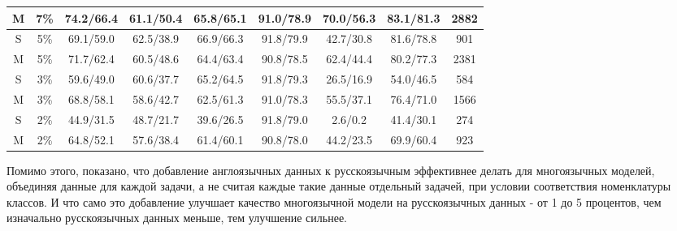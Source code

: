 \begin{table}
{\begin{tabular}{|c|c|c|c|c|c|c|c|c|}
M & 7\% & 74.2/66.4 & 61.1/50.4 & 65.8/65.1 & 91.0/78.9 & 70.0/56.3 & 83.1/81.3 & 2882 \\ \hline
S & 5\% & 69.1/59.0 & 62.5/38.9 & 66.9/66.3 & 91.8/79.9 & 42.7/30.8 & 81.6/78.8 & 901 \\
M & 5\% & 71.7/62.4 & 60.5/48.6 & 64.4/63.4 & 90.8/78.5 & 62.4/44.4 & 80.2/77.3 & 2381 \\ \hline
S & 3\% & 59.6/49.0 & 60.6/37.7 & 65.2/64.5 & 91.8/79.3 & 26.5/16.9 & 54.0/46.5 & 584 \\
M & 3\% & 68.8/58.1 & 58.6/42.7 & 62.5/61.3 & 91.0/78.3 & 55.5/37.1 & 76.4/71.0 & 1566 \\ \hline
S & 2\% & 44.9/31.5 & 48.7/21.7 & 39.6/26.5 & 91.8/79.0 & 2.6/0.2 & 41.4/30.1 & 274 \\
M & 2\% & 64.8/52.1 & 57.6/38.4 & 61.4/60.1 & 90.8/78.0 & 44.2/23.5 & 69.9/60.4 & 923 \\ \hline
\end{tabular}
}
\end{table}


Помимо этого, показано, что добавление англоязычных данных к русскоязычным эффективнее делать для многоязычных моделей, объединяя данные для каждой задачи, а не считая каждые такие данные отдельный задачей, при условии соответствия номенклатуры классов. И что само это добавление улучшает качество многоязычной модели на русскоязычных данных - от 1 до 5 процентов, чем изначально русскоязычных данных меньше, тем улучшение сильнее.


